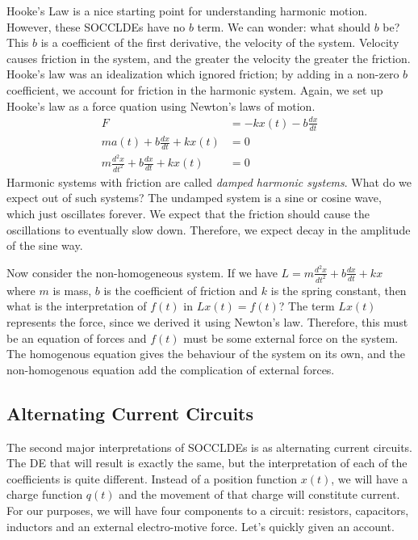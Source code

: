 \documentclass[fleqn,letterpaper]{report}
\begin{document}
Hooke's Law is a nice starting point for understanding
harmonic motion. However, these SOCCLDEs have no $b$ term.
We can wonder: what should $b$ be? This $b$ is a coefficient
of the first derivative, the velocity of the system. Velocity
causes friction in the system, and the greater the velocity
the greater the friction. Hooke's law was an idealization
which ignored friction; by adding in a non-zero $b$
coefficient, we account for friction in the harmonic system.
Again, we set up Hooke's law as a force quation using Newton's
laws of motion.
\begin{align*}
F & = -k x(t) - b \frac{dx}{dt} \\
m a(t) + b \frac{dx}{dt} + k x(t) & = 0 \\
m\frac{d^2 x}{dt^2} + b \frac{dx}{dt} + k x(t) & = 0 
\end{align*}
Harmonic systems with friction are called \emph{damped
harmonic systems}. What do we expect out of such systems?
The undamped system is a sine or cosine wave, which just
oscillates forever. We expect that the friction should cause
the oscillations to eventually slow down. Therefore, we
expect decay in the amplitude of the sine way.

Now consider the non-homogeneous system. If
we have $L = m \frac{d^2x}{dt^2} + b \frac{dx}{dt} + k x$
where $m$ is mass, $b$ is the coefficient of friction and $k$
is the spring constant, then what is the interpretation of
$f(t)$ in $Lx(t) = f(t)$? The term $Lx(t)$ represents the
force, since we derived it using Newton's law. Therefore,
this must be an equation of forces and $f(t)$ must be some
external force on the system. The homogenous equation gives the
behaviour of the system on its own, and the non-homogenous
equation add the complication of external forces.

\subsection{Alternating Current Circuits}
\label{curcuits}

The second major interpretations of SOCCLDEs is as
alternating current circuits. The DE that will result is
exactly the same, but the interpretation of each of the
coefficients is quite different. Instead of a position
function $x(t)$, we will have a charge function $q(t)$ and the
movement of that charge will constitute current. For our
purposes, we will have four components to a circuit:
resistors, capacitors, inductors and an external
electro-motive force. Let's quickly given an account.
\end{document}
